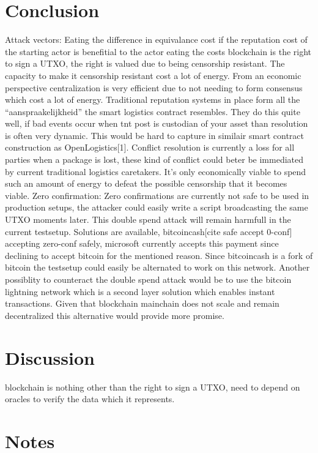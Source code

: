 \documentclass[Nomencl]{DylanMaster}
\begin{document}
\section{Conclusion}

Attack vectors:
Eating the difference in equivalance cost if the reputation cost of the starting actor is benefitial to the actor eating the costs
blockchain is the right to sign a UTXO, the right is valued due to being censorship resistant. The capacity to make it censorship resistant cost a lot of energy. From an economic perspective centralization is very efficient due to not needing to form consensus which cost a lot of energy. Traditional reputation systems in place form all the “aanspraakelijkheid” the smart logistics contract resembles. They do this quite well, if bad events occur  when tnt post is custodian of your asset than resolution is often very dynamic. This would be hard to capture in similair smart contract construction as OpenLogistics[1]. Conflict resolution is currently a loss for all parties when a package is lost, these kind of conflict could beter be immediated by current traditional logistics caretakers.
 It’s only economically viable to spend such an amount of energy to defeat the possible censorship that it becomes viable.
Zero confirmation:
Zero confirmations are currently not safe to be used in production setups, the attacker could easily write a script broadcasting the same UTXO moments later. This double spend attack will remain harmfull in the current testsetup. Solutions are available, bitcoincash[cite safe accept 0-conf] accepting zero-conf safely, microsoft currently accepts this payment since declining to accept bitcoin for the mentioned reason. Since bitcoincash is a fork of bitcoin the testsetup could easily be alternated to work on this network. Another possiblity to counteract the double spend attack would be to use the bitcoin lightning network which is a second layer solution which enables instant transactions. Given that blockchain mainchain does not scale and remain decentralized this alternative would provide more promise.

\section{Discussion}

blockchain is nothing other than the right to sign a UTXO, need to depend on oracles to verify the data which it represents.

\section{Notes}
\end{document}
